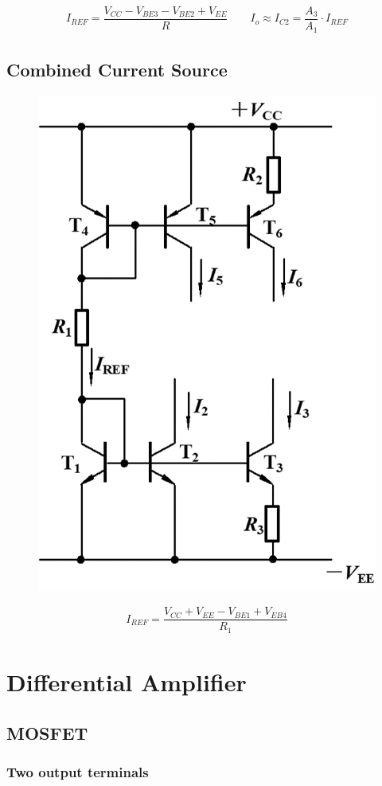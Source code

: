 \begin{equation*}
  \begin{aligned}
    I_{REF} = \dfrac{V_{CC} - V_{BE3} - V_{BE2} + V_{EE}}{R} \quad\quad 
    I_o \approx I_{C2} = \dfrac{A_3}{A_1} \cdot I_{REF} 
  \end{aligned}
\end{equation*}

\subsection{Combined Current Source}

\begin{figure}[H]
  \centering
  \includegraphics[width=0.4\linewidth]{figures/BJT-Combined-Current-Source}
\end{figure}

\begin{equation*}
  \begin{aligned}
    I_{REF} = \dfrac{V_{CC} + V_{EE} - V_{BE1} + V_{EB4}}{R_1} 
  \end{aligned}
\end{equation*}

\section{Differential Amplifier}

\subsection{MOSFET}

\subsubsection{Two output terminals}

